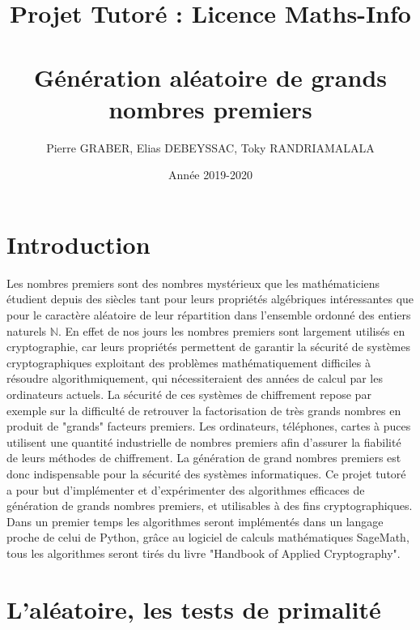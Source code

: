 \documentclass[a4paper,11pt]{article}
\title{Projet Tutoré : Licence Maths-Info
\section*{Génération aléatoire de grands nombres premiers }
\date{ Année 2019-2020}
}
\author{Pierre GRABER, Elias DEBEYSSAC, Toky RANDRIAMALALA}
\begin{document}
\maketitle

\section*{Introduction}
Les nombres premiers sont des nombres mystérieux que les mathématiciens étudient depuis des siècles tant pour leurs propriétés algébriques intéressantes que pour le caractère  aléatoire de leur répartition dans l'ensemble ordonné des entiers naturels $\mathbb{N}$. En effet de nos jours les nombres premiers sont largement utilisés  en cryptographie, car  leurs propriétés permettent de garantir la sécurité de systèmes cryptographiques exploitant des problèmes mathématiquement difficiles à résoudre algorithmiquement, qui nécessiteraient des années de calcul par les ordinateurs actuels. \newline 
La sécurité de ces systèmes de chiffrement repose par exemple sur la difficulté de retrouver la factorisation de très grands nombres en produit de "grands" facteurs premiers. Les ordinateurs, téléphones, cartes à puces utilisent une quantité industrielle de nombres premiers afin d'assurer la fiabilité de leurs méthodes de chiffrement. La génération de grand nombres premiers est donc indispensable pour la sécurité des systèmes informatiques. Ce projet tutoré a pour but d'implémenter et d'expérimenter des algorithmes efficaces de génération de grands nombres premiers, et utilisables à des fins cryptographiques. Dans un premier temps les algorithmes seront implémentés dans un langage proche de celui de Python, grâce au logiciel de calculs mathématiques SageMath, tous les algorithmes seront tirés du livre "Handbook of Applied Cryptography".






\newpage
\tableofcontents


\newpage

\section{L'aléatoire, les tests de primalité}
\end{document}
